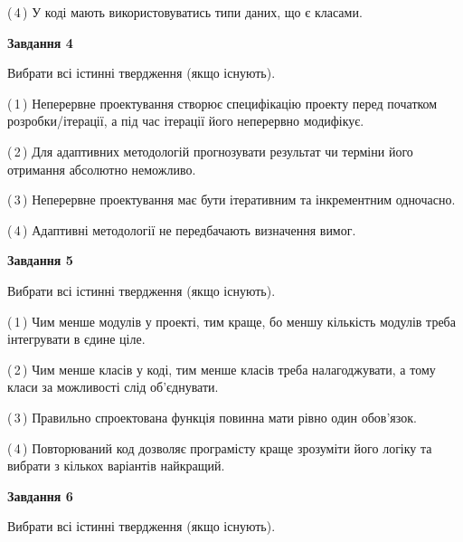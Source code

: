 \documentclass[10pt, ukrainian]{article}
\begin{document}
{\begin {large}
(\,4\,) У коді мають використовуватись типи даних, що є класами. %


{\begin {center}\textbf{Завдання 4}\end {center}}\par
Вибрати всі істинні твердження (якщо існують).\par
\vspace{2mm}



(\,1\,) Неперервне проектування створює специфікацію проекту перед початком розробки/ітерації, а під час ітерації його неперервно модифікує.%



(\,2\,) Для адаптивних методологій прогнозувати результат чи терміни його отримання абсолютно неможливо. %



(\,3\,) Неперервне проектування має бути ітеративним та інкрементним одночасно. %



(\,4\,) Адаптивні методології не передбачають визначення вимог. %


{\begin {center}\textbf{Завдання 5}\end {center}}\par
Вибрати всі істинні твердження (якщо існують).\par
\vspace{2mm}



(\,1\,) Чим менше модулів у проекті, тим краще, бо меншу кількість модулів треба інтегрувати в єдине ціле. %



(\,2\,) Чим менше класів у коді, тим менше класів треба налагоджувати, а тому класи за можливості слід об'єднувати. %



(\,3\,) Правильно спроектована функція повинна мати рівно один обов'язок. %



(\,4\,) Повторюваний код дозволяє програмісту краще зрозуміти його логіку та вибрати з кількох варіантів найкращий. %

\newpage

{\begin {center}\textbf{Завдання 6}\end {center}}\par
Вибрати всі істинні твердження (якщо існують).\par
\vspace{2mm}




\end{large}}
\end{document}

